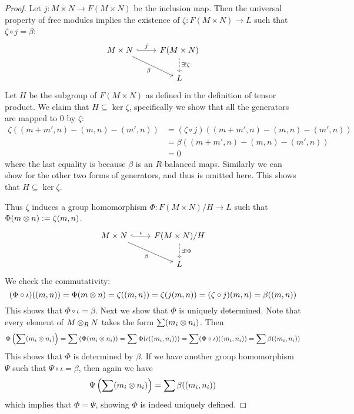 \begin{proof}
    Let $j:M\times N \to F(M\times N)$ be the inclusion map. Then the universal property of free modules implies the existence of $\zeta:F(M\times N)\to L$ such that $\zeta\circ j = \beta$:
    \[\begin{tikzcd} [sep=small]
	           M\times N && F(M\times N) \\
	           \\
	           && L
	           \arrow["j", hook, from=1-1, to=1-3]
	           \arrow["\beta"', from=1-1, to=3-3]
	           \arrow["{\exists! \zeta}", dashed, from=1-3, to=3-3]
    \end{tikzcd}\]
    Let $H$ be the subgroup of $F(M\times N)$ as defined in the definition of tensor product. We claim that $H\subseteq \ker \zeta$, specifically we show that all the generators are mapped to $0$ by $\zeta$:
    \begin{align*}
        \zeta((m+m', n)-(m,n)-(m',n))
        &= (\zeta\circ j)((m+m', n)-(m,n)-(m',n))\\
        &= \beta((m+m', n)-(m,n)-(m',n))\\
        &= 0
    \end{align*}
    where the last equality is because $\beta$ is an $R$-balanced maps. Similarly we can show for the other two forms of generators, and thus is omitted here. This shows that $H\subseteq \ker\zeta$.

    Thus $\zeta$ induces a group homomorphism $\Phi: F(M\times N)/H \to L$ such that $\Phi(m\otimes n) := \zeta(m,n)$.
    \[\begin{tikzcd} [sep=small]
	           M\times N && F(M\times N)/H \\
	           \\
	           && L
	           \arrow["\iota", hook, from=1-1, to=1-3]
	           \arrow["\beta"', from=1-1, to=3-3]
	           \arrow["{\exists! \Phi}", dashed, from=1-3, to=3-3]
    \end{tikzcd}\]
    We check the commutativity:
    \[(\Phi\circ \iota)((m,n)) = \Phi(m\otimes n) = \zeta((m,n)) = \zeta(j(m,n)) = (\zeta\circ j)(m,n) = \beta((m,n)) \]
    This shows that $\Phi\circ \iota = \beta$. Next we show that $\Phi$ is uniquely determined. Note that every element of $M\otimes_R N$ takes the form $\sum(m_i\otimes n_i)$. Then 
    \[\Phi\left(\sum (m_i \otimes n_i)\right) = \sum\left(\Phi(m_i \otimes n_i)\right) = \sum \Phi(\iota((m_i,n_i))) = \sum(\Phi\circ \iota)((m_i,n_i)) = \sum\beta((m_i,n_i))\]
    This shows that $\Phi$ is determined by $\beta$. If we have another group homomorphism $\Psi$ such that $\Psi\circ \iota = \beta$, then again we have
    \[\Psi\left(\sum(m_i\otimes n_i)\right) = \sum\beta((m_i, n_i))\]
    which implies that $\Phi = \Psi$, showing $\Phi$ is indeed uniquely defined.


\end{proof}
